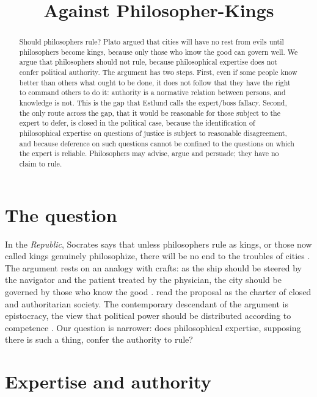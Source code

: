 \documentclass{situationist-preprint}
\title{Against Philosopher-Kings}
\begin{document}
\maketitle

\begin{abstract}
Should philosophers rule? Plato argued that cities will have no rest from evils until philosophers become kings, because only those who know the good can govern well. We argue that philosophers should not rule, because philosophical expertise does not confer political authority. The argument has two steps. First, even if some people know better than others what ought to be done, it does not follow that they have the right to command others to do it: authority is a normative relation between persons, and knowledge is not. This is the gap that Estlund calls the expert/boss fallacy. Second, the only route across the gap, that it would be reasonable for those subject to the expert to defer, is closed in the political case, because the identification of philosophical expertise on questions of justice is subject to reasonable disagreement, and because deference on such questions cannot be confined to the questions on which the expert is reliable. Philosophers may advise, argue and persuade; they have no claim to rule.
\end{abstract}

\section{The question}

In the \emph{Republic}, Socrates says that unless philosophers rule as kings, or those now called kings genuinely philosophize, there will be no end to the troubles of cities \citep[473c--d]{PlatoRep}. The argument rests on an analogy with crafts: as the ship should be steered by the navigator and the patient treated by the physician, the city should be governed by those who know the good \citep[488a--489c]{PlatoRep}. \citet{Popper1945} read the proposal as the charter of closed and authoritarian society. The contemporary descendant of the argument is epistocracy, the view that political power should be distributed according to competence \citep{Brennan2016}. Our question is narrower: does philosophical expertise, supposing there is such a thing, confer the authority to rule?

\section{Expertise and authority}
\end{document}

